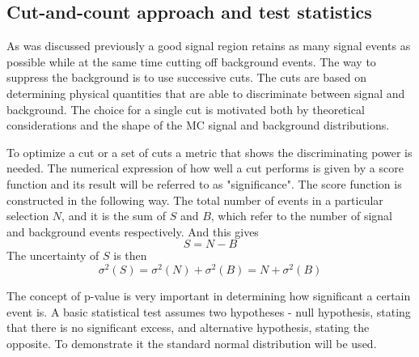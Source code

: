 \subsection{Cut-and-count approach and test statistics}
\label{subsec:stat}
As was discussed previously a good signal region retains as many signal events as possible while at the same time cutting off background events. The way to suppress the background is to use successive cuts. The cuts are based on determining physical quantities that are able to discriminate between signal and background. The choice for a single cut is motivated both by theoretical considerations and the shape of the MC   signal and background distributions. 

To optimize a cut or a set of cuts a metric that shows the discriminating power is needed. The numerical expression of how well a cut performs is given by a score function and its result will be referred to as "significance". The score function is constructed in the following way.
The total number of events in a particular selection $N$, and it is the sum of $S$ and $B$, which refer to the number of signal and background events respectively. And this gives
\begin{equation}
S = N -B
\end{equation}
The uncertainty of $S$ is then
\begin{equation}
\sigma^2(S) = \sigma^2(N) + \sigma^2(B) = N+\sigma^2(B)
\end{equation}
 

The concept of p-value is very important in determining how significant a certain event is. A basic statistical test assumes two hypotheses - null hypothesis, stating that there is no significant excess, and alternative hypothesis, stating the opposite.
To demonstrate it the standard normal distribution will be used. 
 
